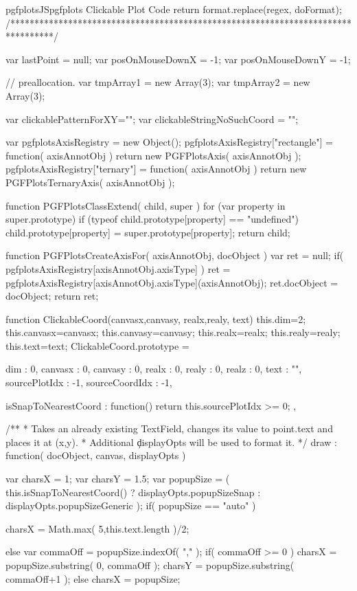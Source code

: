 {{\begin{insDLJS}[processAnnotatedPlot]{pgfplotsJS}{pgfplots Clickable Plot Code}
{    return format.replace(regex, doFormat);
}
/*********************************************************************************/


var lastPoint = null;
var posOnMouseDownX = -1;
var posOnMouseDownY = -1;

// preallocation.
var tmpArray1 = new Array(3);
var tmpArray2 = new Array(3);

var clickablePatternForXY="";
var clickableStringNoSuchCoord = "";

var pgfplotsAxisRegistry = new Object();
pgfplotsAxisRegistry["rectangle"]	= function( axisAnnotObj ) { return new PGFPlotsAxis( axisAnnotObj ); }
pgfplotsAxisRegistry["ternary"]		= function( axisAnnotObj ) { return new PGFPlotsTernaryAxis( axisAnnotObj ); }

function PGFPlotsClassExtend( child, super )
{
	for (var property in super.prototype) {
		if (typeof child.prototype[property] == "undefined")
			child.prototype[property] = super.prototype[property];
	}
	return child;
}

function PGFPlotsCreateAxisFor( axisAnnotObj, docObject )
{
	var ret = null;
	if( pgfplotsAxisRegistry[axisAnnotObj.axisType] ) {
		ret = pgfplotsAxisRegistry[axisAnnotObj.axisType](axisAnnotObj);
		ret.docObject = docObject;
	}
	return ret;
}

function ClickableCoord(canvasx,canvasy, realx,realy, text)
{
	this.dim=2;
	this.canvasx=canvasx;
	this.canvasy=canvasy;
	this.realx=realx;
	this.realy=realy;
	this.text=text;
}
ClickableCoord.prototype = 
{
	dim : 0,
	canvasx : 0,
	canvasy : 0,
	realx : 0,
	realy : 0,
	realz : 0,
	text : "",
	sourcePlotIdx : -1,
	sourceCoordIdx : -1,

	isSnapToNearestCoord : function() {
		return this.sourcePlotIdx >= 0;
	},

	/**
	 * Takes an already existing TextField, changes its value to point.text and places it at (x,y).
	 * Additional \c displayOpts will be used to format it.
	 */
	draw : function( docObject, canvas, displayOpts )
	{
		var charsX = 1;
		var charsY = 1.5;
		var popupSize = ( this.isSnapToNearestCoord() ? displayOpts.popupSizeSnap : displayOpts.popupSizeGeneric );
		if( popupSize == "auto" ) {
			charsX = Math.max( 5,this.text.length )/2;

		} else {
			var commaOff = popupSize.indexOf( "," );
			if( commaOff >= 0 ) {
				charsX = popupSize.substring( 0, commaOff );
				charsY = popupSize.substring( commaOff+1 );
			} else
				charsX = popupSize;
		}

}}
\end{insDLJS}}}
